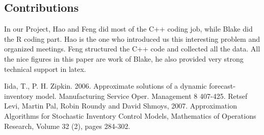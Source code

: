 \documentclass[twoside]{article}
\begin{document}
\begin{multicols}{2}
\section{Contributions}
In our Project, Hao and Feng did most of the C++ coding job, while Blake did the R coding part. Hao is the one who introduced us this interesting problem and organized meetings. Feng structured the C++ code and collected all the data. All the nice figures in this paper are work of Blake, he also provided very strong technical support in latex.



\begin{thebibliography}{99} %

Iida, T., P. H. Zipkin. 2006. Approximate solutions of a dynamic forecast-inventory model. Manufacturing Service Oper. Management
8 407-425.
Retsef Levi, Martin Pal, Robin Roundy and David Shmoys, 2007. Approximation Algorithms for Stochastic Inventory Control Models, Mathematics of Operations Research, Volume 32 (2), pages 284-302.

\end{thebibliography}


\end{multicols}
\end{document}
